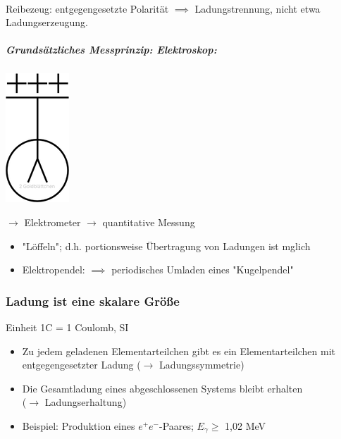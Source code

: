 \documentclass[11pt]{article}
\begin{document}
			\linebreak\\
			Reibezeug: entgegengesetzte Polarit\"{a}t
			$\implies$ Ladungstrennung, nicht etwa Ladungserzeugung.
			\newpage
			\subparagraph {Grunds\"{a}tzliches Messprinzip: Elektroskop:}
			
			\begin{center}
				\includegraphics{skizzen/14/14_1B1}
			\end{center}
			
			$\rightarrow$ Elektrometer $\rightarrow$ quantitative Messung
			\begin{itemize}
				\item "L\"{o}ffeln"; d.h. portionsweise Übertragung von Ladungen ist mglich
				\item Elektropendel: $\implies$ periodisches Umladen eines "Kugelpendel"
			\end{itemize}
			
			\subsubsection{Ladung ist eine skalare Gr\"{o}\ss{}e } Einheit 1C = 1 Coulomb, SI
				\begin{itemize}
					\item Zu jedem geladenen Elementarteilchen gibt es ein Elementarteilchen mit entgegengesetzter Ladung ($\rightarrow$ Ladungssymmetrie)
					\item Die Gesamtladung eines abgeschlossenen Systems bleibt erhalten \\
					($\rightarrow$ Ladungserhaltung)
					\item Beispiel: Produktion eines $ e^+e^- $-Paares; $ E_\gamma \geq $ 1,02 MeV
				\end{itemize}
				
\end{document}
